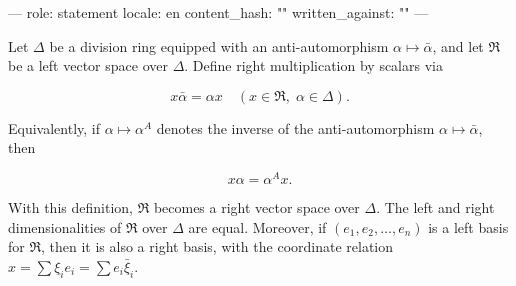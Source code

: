 ---
role: statement
locale: en
content_hash: ""
written_against: ""
---

Let $\Delta$ be a division ring equipped with an anti-automorphism $\alpha \mapsto \bar{\alpha}$, and let $\mathfrak{R}$ be a left vector space over $\Delta$. Define right multiplication by scalars via

$$x \bar{\alpha} = \alpha x \quad (x \in \mathfrak{R},\; \alpha \in \Delta).$$

Equivalently, if $\alpha \mapsto \alpha^A$ denotes the inverse of the anti-automorphism $\alpha \mapsto \bar{\alpha}$, then

$$x \alpha = \alpha^A x.$$

With this definition, $\mathfrak{R}$ becomes a right vector space over $\Delta$. The left and right dimensionalities of $\mathfrak{R}$ over $\Delta$ are equal. Moreover, if $(e_1, e_2, \dots, e_n)$ is a left basis for $\mathfrak{R}$, then it is also a right basis, with the coordinate relation $x = \sum \xi_i e_i = \sum e_i \bar{\xi}_i$.
